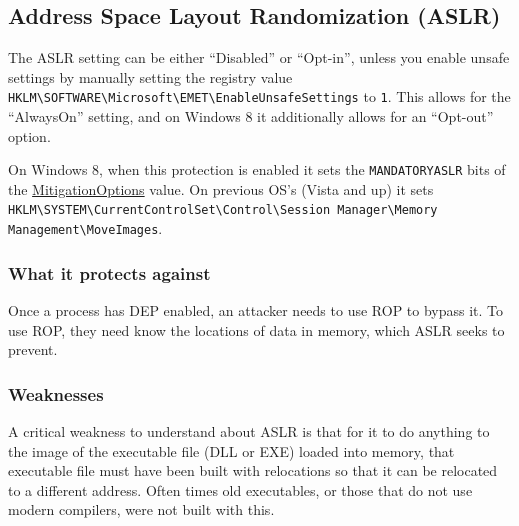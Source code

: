 \documentclass[]{article}
\begin{document}
\subsection{Address Space Layout Randomization (ASLR)}\label{system_aslr}

The ASLR setting can be either ``Disabled'' or ``Opt-in'', unless you
enable unsafe settings by manually setting the registry value
\texttt{HKLM\textbackslash{}SOFTWARE\textbackslash{}Microsoft\textbackslash{}EMET\textbackslash{}EnableUnsafeSettings}
to \texttt{1}. This allows for the ``AlwaysOn'' setting, and on Windows
8 it additionally allows for an ``Opt-out'' option. 



On Windows 8, when this protection is enabled it sets the
\texttt{MANDATORYASLR} bits of the
\hyperref[MitigationOptions]{MitigationOptions} value. On previous OS's
(Vista and up) it sets
\texttt{HKLM\textbackslash{}SYSTEM\textbackslash{}CurrentControlSet\textbackslash{}Control\textbackslash{}Session Manager\textbackslash{}Memory Management\textbackslash{}MoveImages}.



\subsubsection{What it protects against}

Once a process has DEP enabled, an attacker needs to use ROP to bypass
it. To use ROP, they need know the locations of data in memory, which
ASLR seeks to prevent.

\subsubsection{Weaknesses}

A critical weakness to understand about ASLR is that for it to do anything
to the image of the executable file (DLL or EXE) loaded into memory,
that executable file must have been built with relocations so that it can be relocated to a different address. Often times old executables, or those that do not use
modern compilers, were not built with this. 
\end{document}
